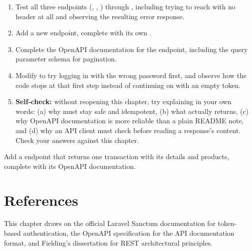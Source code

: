 \begin{enumerate}
  \item Test all three endpoints (, ,
    ) through , including trying to reach
     with no  header at all
    and observing the resulting error response.
  \item Add a new  endpoint, complete with
    its own .
  \item Complete the OpenAPI documentation for the
     endpoint, including the query parameter
    schema for pagination.
  \item Modify  to try logging in with the
    wrong password first, and observe how the code stops at that first
    step instead of continuing on with an empty token.
  \item \textbf{Self-check:} without reopening this chapter, try
    explaining in your own words: (a) why  must stay safe
    and idempotent, (b) what  actually returns,
    (c) why OpenAPI documentation is more reliable than a plain README
    note, and (d) why an API client must check 
    before reading a response's content. Check your answers against
    this chapter.
\end{enumerate}

\begin{challengebox}
Add a  endpoint that returns one
transaction with its details and products, complete with its OpenAPI
documentation.
\end{challengebox}

\section{References}

This chapter draws on the official Laravel Sanctum documentation
\cite{sanctumdocs} for token-based authentication, the OpenAPI
specification \cite{openapispec} for the API documentation format, and
Fielding's dissertation \cite{fielding2000rest} for REST architectural
principles.
